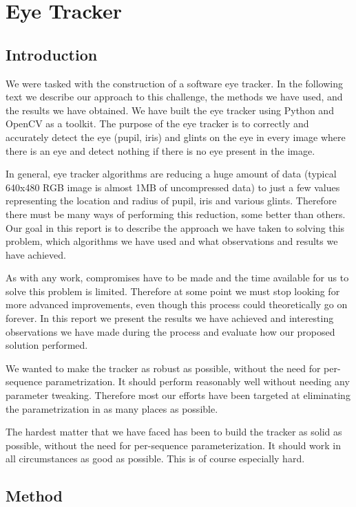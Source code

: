 \pagebreak
\section{Eye Tracker}

\subsection{Introduction}
We were tasked with the construction of a software eye tracker. In the following text we describe our approach to this challenge, the methods we have used, and the results we have obtained.  We have built the eye tracker using Python and OpenCV as a toolkit. The purpose of the eye tracker is to correctly and accurately detect the eye (pupil, iris) and glints on the eye in every image where there is an eye and detect nothing if there is no eye present in the image.

In general, eye tracker algorithms are reducing a huge amount of data (typical 640x480 RGB image is almost 1MB of uncompressed data) to just a few values representing the location and radius of pupil, iris and various glints. Therefore there must be many ways of performing this reduction, some better than others. Our goal in this report is to describe the approach we have taken to solving this problem, which algorithms we have used and what observations and results we have achieved.

As with any work, compromises have to be made and the time available for us to solve this problem is limited. Therefore at some point we must stop looking for more advanced improvements, even though this process could theoretically go on forever. In this report we present the results we have achieved and interesting observations we have made during the process and evaluate how our proposed solution performed.

We wanted to make the tracker as robust as possible, without the need for per-sequence parametrization. It should perform reasonably well without needing any parameter tweaking. Therefore most our efforts have been targeted at eliminating the parametrization in as many places as possible.

The hardest matter that we have faced has been to build the tracker as solid as possible, without the need for per-sequence parameterization. It should work in all circumstances as good as possible. This is of course especially hard.

\subsection{Method}


